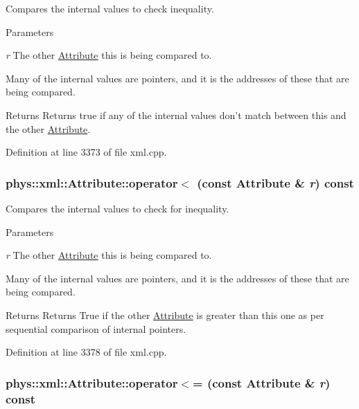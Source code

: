 Compares the internal values to check inequality. 


\begin{DoxyParams}{Parameters}
\item[{\em r}]The other \hyperlink{classphys_1_1xml_1_1Attribute}{Attribute} this is being compared to.\end{DoxyParams}
Many of the internal values are pointers, and it is the addresses of these that are being compared. \begin{DoxyReturn}{Returns}
Returns true if any of the internal values don't match between this and the other \hyperlink{classphys_1_1xml_1_1Attribute}{Attribute}. 
\end{DoxyReturn}


Definition at line 3373 of file xml.cpp.

\hypertarget{classphys_1_1xml_1_1Attribute_ac383f0c514e550fe992b1c0a0f3cbd7a}{
\subsubsection[{operator$<$}]{\setlength{\rightskip}{0pt plus 5cm}phys::xml::Attribute::operator$<$ (const {\bf Attribute} \& {\em r}) const}}
\label{da/ddf/classphys_1_1xml_1_1Attribute_ac383f0c514e550fe992b1c0a0f3cbd7a}


Compares the internal values to check for inequality. 


\begin{DoxyParams}{Parameters}
\item[{\em r}]The other \hyperlink{classphys_1_1xml_1_1Attribute}{Attribute} this is being compared to.\end{DoxyParams}
Many of the internal values are pointers, and it is the addresses of these that are being compared. \begin{DoxyReturn}{Returns}
Returns True if the other \hyperlink{classphys_1_1xml_1_1Attribute}{Attribute} is greater than this one as per sequential comparison of internal pointers. 
\end{DoxyReturn}


Definition at line 3378 of file xml.cpp.

\hypertarget{classphys_1_1xml_1_1Attribute_a3b73bd409a2b6b9a7d72c3affc96bae1}{
\subsubsection[{operator$<$=}]{\setlength{\rightskip}{0pt plus 5cm}phys::xml::Attribute::operator$<$= (const {\bf Attribute} \& {\em r}) const}}
\label{da/ddf/classphys_1_1xml_1_1Attribute_a3b73bd409a2b6b9a7d72c3affc96bae1}



